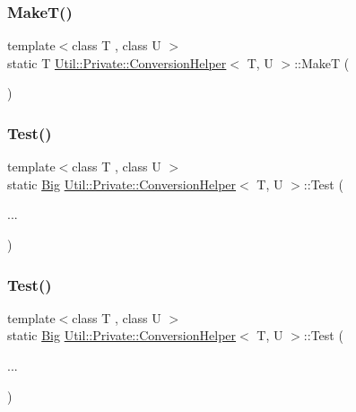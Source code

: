 \subsubsection{\texorpdfstring{MakeT()}{MakeT()}\hspace{0.1cm}{\footnotesize\ttfamily [3/3]}}
{\footnotesize\ttfamily template$<$class T , class U $>$ \\
static T \mbox{\hyperlink{structUtil_1_1Private_1_1ConversionHelper}{Util\+::\+Private\+::\+Conversion\+Helper}}$<$ T, U $>$\+::MakeT (\begin{DoxyParamCaption}{ }\end{DoxyParamCaption})\hspace{0.3cm}{\ttfamily [static]}}

\mbox{\label{structUtil_1_1Private_1_1ConversionHelper_a70eb55dfb70dbf3459524083d35e350b}} 
\subsubsection{\texorpdfstring{Test()}{Test()}\hspace{0.1cm}{\footnotesize\ttfamily [1/6]}}
{\footnotesize\ttfamily template$<$class T , class U $>$ \\
static \mbox{\hyperlink{structUtil_1_1Private_1_1ConversionHelper_1_1Big}{Big}} \mbox{\hyperlink{structUtil_1_1Private_1_1ConversionHelper}{Util\+::\+Private\+::\+Conversion\+Helper}}$<$ T, U $>$\+::Test (\begin{DoxyParamCaption}\item[{}]{... }\end{DoxyParamCaption})\hspace{0.3cm}{\ttfamily [static]}}

\mbox{\label{structUtil_1_1Private_1_1ConversionHelper_a70eb55dfb70dbf3459524083d35e350b}} 
\subsubsection{\texorpdfstring{Test()}{Test()}\hspace{0.1cm}{\footnotesize\ttfamily [2/6]}}
{\footnotesize\ttfamily template$<$class T , class U $>$ \\
static \mbox{\hyperlink{structUtil_1_1Private_1_1ConversionHelper_1_1Big}{Big}} \mbox{\hyperlink{structUtil_1_1Private_1_1ConversionHelper}{Util\+::\+Private\+::\+Conversion\+Helper}}$<$ T, U $>$\+::Test (\begin{DoxyParamCaption}\item[{}]{... }\end{DoxyParamCaption})\hspace{0.3cm}{\ttfamily [static]}}

